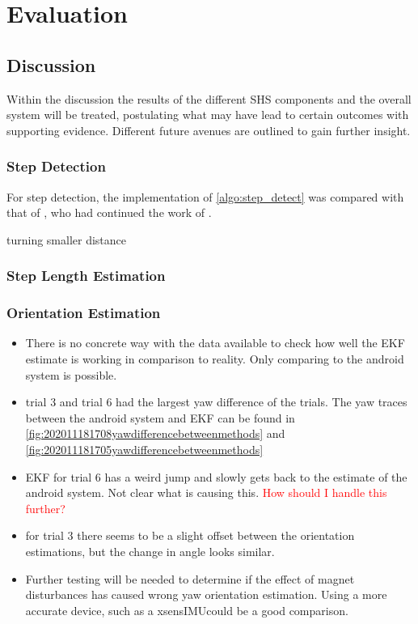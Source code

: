 \chapter{Evaluation}

\section{Discussion}
Within the discussion the results of the different \ac{SHS} components and the overall system will be treated, postulating what may have lead to certain outcomes with supporting evidence. Different future avenues are outlined to gain further insight.

\subsection*{Step Detection}
For step detection, the implementation of \cref{algo:step_detect} was compared with that of \citet{Salvi2018}, who had continued the work of \cite{Harle2013}.  \par 


turning smaller distance \cite{Sun2015}

\subsection*{Step Length Estimation}


\newpage

\subsection*{Orientation Estimation}

\begin{itemize}
	\item There is no concrete way with the data available to check how well the EKF estimate is working in comparison to reality. Only comparing to the android system is possible.
	\item trial 3 and trial 6 had the largest yaw difference of the trials. The yaw traces between the android system and EKF can be found in \cref{fig:202011181708yawdifferencebetweenmethods} and \cref{fig:202011181705yawdifferencebetweenmethods}
	\item EKF for trial 6 has a weird jump and slowly gets back to the estimate of the android system. Not clear what is causing this. \textcolor{red}{How should I handle this further?}
	\item for trial 3 there seems to be a slight offset between the orientation estimations, but the change in angle looks similar.
	\item Further testing will be needed to determine if the effect of magnet disturbances has caused wrong yaw orientation estimation. Using a more accurate device, such as a xsens\ac{IMU}could be a good comparison.
\end{itemize}

